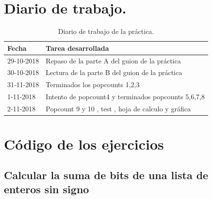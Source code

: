 	\tableofcontents %
	
	\listoffigures %
	
	\listoftables %
	
	\newpage
	
	\section[Diario de trabajo]{Diario de trabajo.}
		
	\begin{table}[htbp]
		\begin{center}
			\begin{tabular}{|l|l|}
				\hline
				Fecha & Tarea desarrollada \\
				\hline \hline
				29-10-2018 & Repaso de la parte A del guion de la práctica \\ \hline
				30-10-2018 & Lectura de la parte B del guion de la práctica \\ \hline
				31-11-2018 & Terminados los popcounts 1,2,3 \\ \hline
				1-11-2018 & Intento de popcount4 y terminados popcounts 5,6,7,8 \\ \hline
				2-11-2018 & Popcount 9 y 10 , test , hoja de calculo y gráfica\\ \hline
			\end{tabular}
			\caption{Diario de trabajo de la práctica.}
			\label{tabla:sencilla}
		\end{center}
	\end{table}
	
	\section[Código de los ejercicios]{Código de los ejercicios}
	
	
	\subsection{Calcular la suma de bits de una lista de enteros sin signo}
	
